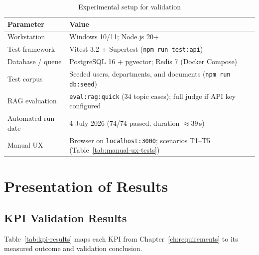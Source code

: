 \begin{table}[H]
\centering
\caption{Experimental setup for validation}
\label{tab:validation-setup}
\footnotesize
\renewcommand{\arraystretch}{1.35}
\setlength{\tabcolsep}{4pt}
\begin{tabularx}{\textwidth}{|>{\RaggedRight\arraybackslash}p{3.0cm}|Y|}
\hline
\textbf{Parameter} & \textbf{Value} \\
\hline
Workstation & Windows 10/11; Node.js 20+ \\
\hline
Test framework & Vitest 3.2 + Supertest (\texttt{npm run test:api}) \\
\hline
Database / queue & PostgreSQL 16 + pgvector; Redis 7 (Docker Compose) \\
\hline
Test corpus & Seeded users, departments, and documents (\texttt{npm run db:seed}) \\
\hline
RAG evaluation & \texttt{eval:rag:quick} (34 topic cases); full judge if API key configured \\
\hline
Automated run date & 4 July 2026 (74/74 passed, duration $\approx$39\,s) \\
\hline
Manual UX & Browser on \texttt{localhost:3000}; scenarios T1--T5 (Table~\ref{tab:manual-ux-tests}) \\
\hline
\end{tabularx}
\end{table}

\section{Presentation of Results}

\subsection{KPI Validation Results}

Table~\ref{tab:kpi-results} maps each KPI from Chapter~\ref{ch:requirements} to its
measured outcome and validation conclusion.

